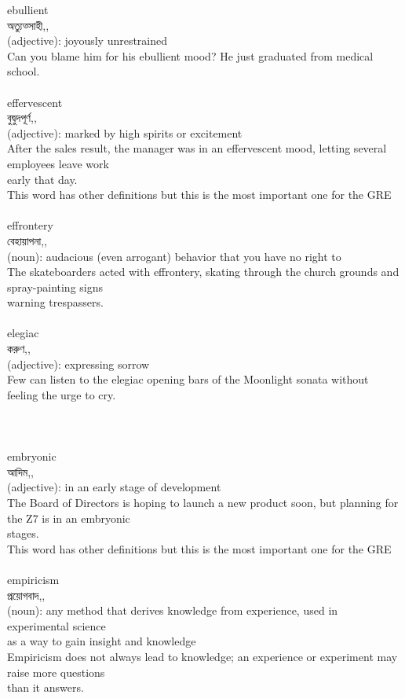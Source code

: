 \documentclass{article}
\begin{document}
{ebullient}\\
{অত্যুত্সাহী,,}\\
{(adjective): joyously unrestrained\\Can you blame him for his ebullient mood? He just graduated from medical school.\\}\\
{effervescent}\\
{বুদ্বুদপূর্ণ,,}\\
{(adjective): marked by high spirits or excitement\\After the sales result, the manager was in an effervescent mood, letting several employees leave work\\early that day.\\This word has other definitions but this is the most important one for the GRE\\}\\
{effrontery}\\
{বেহায়াপনা,,}\\
{(noun): audacious (even arrogant) behavior that you have no right to\\The skateboarders acted with effrontery, skating through the church grounds and spray-painting signs\\warning trespassers.\\}\\
{elegiac}\\
{করুণ,,}\\
{(adjective): expressing sorrow\\Few can listen to the elegiac opening bars of the Moonlight sonata without feeling the urge to cry.\\\\                                                                                \\}\\
{embryonic}\\
{আদিম,,}\\
{(adjective): in an early stage of development\\The Board of Directors is hoping to launch a new product soon, but planning for the Z7 is in an embryonic\\stages.\\This word has other definitions but this is the most important one for the GRE\\}\\
{empiricism}\\
{প্রয়োগবাদ,,}\\
{(noun): any method that derives knowledge from experience, used in experimental science\\as a way to gain insight and knowledge\\Empiricism does not always lead to knowledge; an experience or experiment may raise more questions\\than it answers.\\}\\
\end{document}
